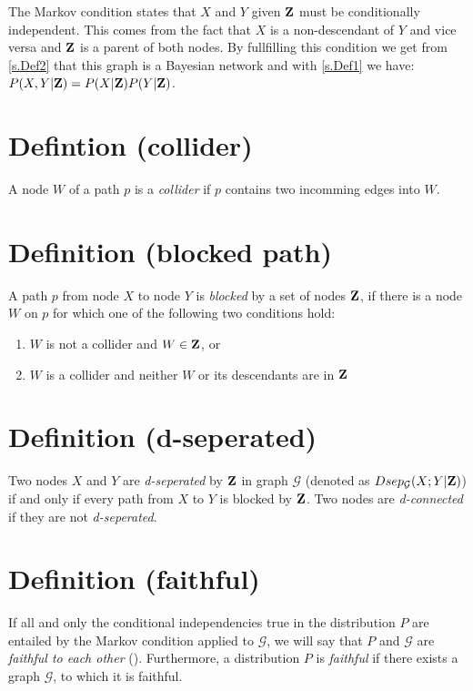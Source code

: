		The Markov condition states that $X$ and $Y$ given ${\textbf{Z}}$ must be conditionally independent. This comes from the fact that $X$ is a non-descendant of $Y$ and vice versa and ${\textbf{Z}}$ is a parent of both nodes. By fullfilling this condition we get from \autoref{s.Def2} that this graph is a Bayesian network and with \autoref{s.Def1} we have: $P(X , Y|{\textbf{Z}}) = P(X|{\textbf{Z}})P(Y|{\textbf{Z}})$.

	\section*{Defintion (collider)} \label{s.Def4}

		A node $W$ of a path $p$ is a \textit{collider} if $p$ contains two incomming edges into $W$.

	\section*{Definition (blocked path)} \label{s.Def5}

		A path $p$ from node $X$ to node $Y$ is \textit{blocked} by a set of nodes ${\textbf{Z}}$, if there is a node $W$ on $p$ for which one of the following two conditions hold:

		\begin{enumerate}
			\item $W$ is not a collider and $W \in {\textbf{Z}}$, or
			\item $W$ is a collider and neither $W$ or its descendants are in ${\textbf{Z}}$ \cite{P88}
		\end{enumerate}

	\section*{Definition (d-seperated)} \label{s.Def6}

		Two nodes $X$ and $Y$ are \textit{d-seperated} by ${\textbf{Z}}$ in graph $\mathcal{G}$ (denoted as $Dsep_{\mathcal{G}}(X;Y|{\textbf{Z}})$) if and only if every path from $X$ to $Y$ is blocked by ${\textbf{Z}}$. Two nodes are \textit{d-connected} if they are not \textit{d-seperated}.

	\section*{Definition (faithful)} \label{s.Def7}

		If all and only the conditional independencies true in the distribution $P$ are entailed by the Markov condition applied to $\mathcal{G}$, we will say that $P$ and $\mathcal{G}$ are \textit{faithful to each other} (\cite{SGSN}). Furthermore, a distribution $P$ is \textit{faithful} if there exists a graph $\mathcal{G}$, to which it is faithful.

